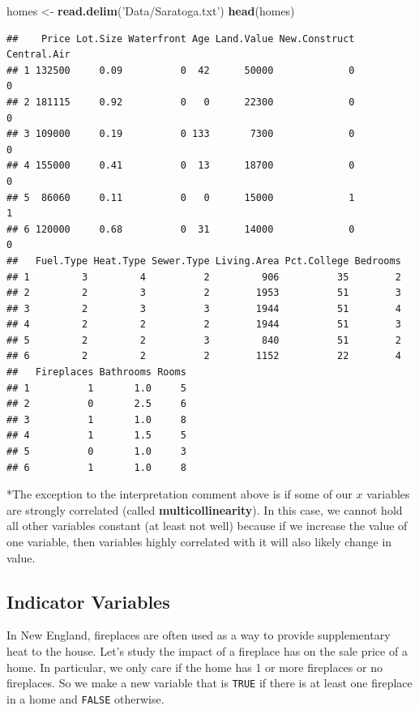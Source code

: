 \documentclass[]{book}
\newenvironment{Shaded}{\begin{snugshade}}{\end{snugshade}}
\newcommand{\KeywordTok}[1]{\textcolor[rgb]{0.13,0.29,0.53}{\textbf{#1}}}
\newcommand{\NormalTok}[1]{#1}
\newcommand{\StringTok}[1]{\textcolor[rgb]{0.31,0.60,0.02}{#1}}
\begin{document}
\begin{Shaded}
\begin{Highlighting}[]
\NormalTok{homes <-}\StringTok{ }\KeywordTok{read.delim}\NormalTok{(}\StringTok{'Data/Saratoga.txt'}\NormalTok{)}
\KeywordTok{head}\NormalTok{(homes)}
\end{Highlighting}
\end{Shaded}

\begin{verbatim}
##    Price Lot.Size Waterfront Age Land.Value New.Construct Central.Air
## 1 132500     0.09          0  42      50000             0           0
## 2 181115     0.92          0   0      22300             0           0
## 3 109000     0.19          0 133       7300             0           0
## 4 155000     0.41          0  13      18700             0           0
## 5  86060     0.11          0   0      15000             1           1
## 6 120000     0.68          0  31      14000             0           0
##   Fuel.Type Heat.Type Sewer.Type Living.Area Pct.College Bedrooms
## 1         3         4          2         906          35        2
## 2         2         3          2        1953          51        3
## 3         2         3          3        1944          51        4
## 4         2         2          2        1944          51        3
## 5         2         2          3         840          51        2
## 6         2         2          2        1152          22        4
##   Fireplaces Bathrooms Rooms
## 1          1       1.0     5
## 2          0       2.5     6
## 3          1       1.0     8
## 4          1       1.5     5
## 5          0       1.0     3
## 6          1       1.0     8
\end{verbatim}

*The exception to the interpretation comment above is if some of our \(x\) variables are strongly correlated (called \textbf{multicollinearity}). In this case, we cannot hold all other variables constant (at least not well) because if we increase the value of one variable, then variables highly correlated with it will also likely change in value.

\hypertarget{indicator-variables}{%
\subsection{Indicator Variables}\label{indicator-variables}}

In New England, fireplaces are often used as a way to provide supplementary heat to the house. Let's study the impact of a fireplace has on the sale price of a home. In particular, we only care if the home has 1 or more fireplaces or no fireplaces. So we make a new variable that is \texttt{TRUE} if there is at least one fireplace in a home and \texttt{FALSE} otherwise.
\end{document}
